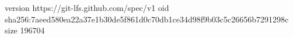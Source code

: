 version https://git-lfs.github.com/spec/v1
oid sha256:7aeed580ea22a37e1b30de5f861d0c70db1ce34d98f9b03c5c26656b7291298c
size 196704
